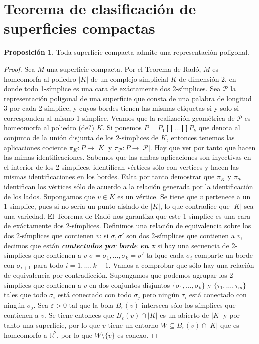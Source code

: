 \documentclass[10pt]{report}
\newcommand{\R}{\mathbb{R}}
\newcommand{\enfatiza}[1]{\textbf{\textit{#1}}}
\theoremstyle{definition}
\newtheorem{prop}[defin]{Proposición}
\begin{document}




\section{Teorema de clasificación de superficies compactas}

\begin{prop}\label{prop:superficie_tiene_representacion}%
Toda superficie compacta admite una representación poligonal.
\end{prop}
\begin{proof}
Sea $M$ una superficie compacta. Por el Teorema de Radó, $M$ es homeomorfa al poliedro $|K|$ de un complejo simplicial $K$ de dimensión 2, en donde todo 1-símplice es una cara de exáctamente dos 2-símplices.
Sea $\mathcal{P}$ la representación poligonal de una superficie que consta de una palabra de longitud 3 por cada 2-símplice, y cuyos bordes tienen las mismas etiquetas si y solo si corresponden al mismo 1-símplice. Veamos que la realización geométrica de $\mathcal{P}$ es homeomorfa al poliedro (de?) $K$.
Si ponemos $P=P_1\amalg \dots \amalg P_k$ que denota al conjunto de la unión disjunta de los 2-símplices de $K$, entonces tenemos las aplicaciones cociente $\pi_K :P\to |K|$ y $\pi_{\mathcal{P}} :P\to |\mathcal{P}|$. Hay que ver por tanto que hacen las mimas identificaciones. Sabemos que las ambas aplicaciones son inyectivas en el interior de los 2-símplices, identifican vértices sólo con vertices y hacen las mismas identificaciones en los bordes. Falta por tanto demostrar que $\pi_K$ y $\pi_{\mathcal{P}}$ identifican los vértices sólo de acuerdo a la relación generada por la identificación de los lados.
Supongamos que $v\in K$ es un vértice. Se tiene que $v$ pertenece a un 1-símplice, pues si no sería un punto aislado de $|K|$, lo que contradice que $|K|$ sea una variedad. El Teorema de Radó nos garantiza que este 1-símplice es una cara de exáctamente dos 2-símplices. Definimos una relación de equivalencia sobre los dos 2-símplices que contienen $v$: si $\sigma , \sigma '$ son dos 2-símplices que contienen a $v$, decimos que están \enfatiza{contectados por borde en v} si hay una secuencia de 2-símplices que contienen a $v$ $\sigma =\sigma_1 ,\dots ,\sigma_k =\sigma '$ ta lque cada $\sigma_i$ comparte un borde con $\sigma_{i+1}$  para todo $i=1,\dots , k-1$. Vamos a comprobar que sólo hay una relación de equivalencia por contradicción. Supongamos que podemos agrupar los 2-símplices que contienen a $v$ en dos conjuntos disjuntos $\{ \sigma_1 ,\dots ,\sigma_k \}$ y $\{ \tau_1 ,\dots ,\tau_m \}$ tales que todo $\sigma_i$ está conectado con todo $\sigma_j$ pero ningún $\tau_i$ está conectado con ningún $\sigma_j$.  Sea $\varepsilon >0$ tal que la bola $B_{\varepsilon}(v)$ interseca sólo los símplices que contienen a $v$.  Se tiene entonces que $B_{\varepsilon}(v)\cap |K|$ es un abierto de $|K|$ y por tanto una superficie, por lo que $v$ tiene un entorno $W\subseteq B_{\varepsilon}(v)\cap |K|$ que es homeomorfo a $\R^2$, por lo que $W\setminus \{ v \}$ es conexo. 

\end{proof}
\end{document}
